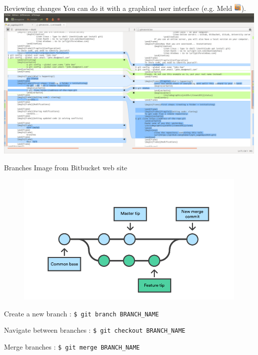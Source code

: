\documentclass{beamer}
\begin{document}
	\begin{frame}{Reviewing changes}
	You can do it with a graphical user interface (e.g. Meld \includegraphics[height=1em]{meld_logo}).\\
	\vspace{1em}
	\includegraphics[width=\linewidth]{meld_ps}
	\end{frame}

	\begin{frame}[fragile]{Branches}
		\footnotesize{Image from Bitbucket web site} \vspace{-.5cm}
		\begin{figure}[h]
			\centering
			\includegraphics[scale=.3]{branch.png}
		\end{figure}
		
		Create a new branch : \texttt{\$ git branch BRANCH\_NAME}
		
		Navigate between branches : \texttt{\$ git checkout BRANCH\_NAME}
		
		Merge branches : \texttt{\$ git merge BRANCH\_NAME}
	\end{frame}
\end{document}
